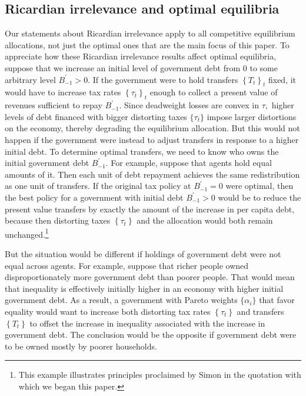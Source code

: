\documentclass[thmsb,11pt]{article}
\begin{document}
\subsection{Ricardian irrelevance and optimal equilibria}

Our statements about Ricardian irrelevance apply to all competitive equilibrium allocations,
not just the optimal ones that are the main focus of this paper.
To appreciate how  these  Ricardian irrelevance results affect optimal equilibria, suppose that we increase an
initial level of government debt from $0$ to some arbitrary level $%
B_{-1}^{\prime } > 0$. If the government were to hold transfers $\left\{ T_{t}\right\} _{t}$ fixed, it would
 have  to increase  tax rates $\left\{ \tau
_{t}\right\} _{t}$ enough to collect a present value of revenues sufficient to
repay $B_{-1}^{\prime }$. Since deadweight losses are convex in $\tau ,$
higher levels of debt financed with bigger distorting taxes $\{\tau_t\}$  impose larger
distortions on the economy, thereby degrading the equilibrium allocation.  But this would not happen  if
the government were instead  to adjust transfers in response to a higher initial debt. To determine optimal transfers, we need to
know who owns  the initial government debt $B_{-1}^{\prime }$. For example, suppose that agents hold equal amounts of it. Then
each unit of debt repayment achieves the same redistribution as one
unit of transfers. If the original tax policy  at $B_{-1}^{\prime } =0 $ were optimal, then  the best policy for a government with  initial debt $%
B_{-1}^{\prime } >0 $ would be to reduce the present value  transfers by exactly the amount of the
increase in per capita debt, because then distorting taxes $\left\{ \tau
_{t}\right\} $ and the allocation would both remain unchanged.\footnote{This example illustrates
principles proclaimed by Simon \citet[p. 85]{newcomb1865critical} in the quotation with
which we began this paper.}

But the situation would be different if  holdings of government
debt were not equal across agents. For example, suppose  that  richer people owned disproportionately more government debt
than poorer people. That would mean that inequality
is  effectively initially  higher in an economy with higher initial government debt. As a result, a
government with Pareto weights $\{\alpha_i\}$ that favor equality would want to increase both  distorting  tax rates $\left\{ \tau _{t}\right\} $
and transfers $\left\{ T_{t}\right\} $ to offset the increase in inequality
associated with the increase in government debt. The conclusion would be the
opposite if government debt were to be  owned mostly by poorer
households.
\end{document}

